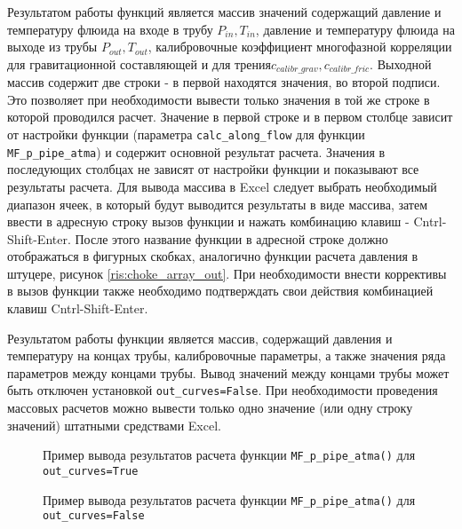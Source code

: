Результатом работы функций является массив значений содержащий давление и температуру флюида на входе в трубу $P_{in}, T_{in}$, давление и температуру флюида на выходе из трубы $P_{out}, T_{out}$,  калибровочные коэффициент многофазной корреляции для гравитационной составляющей и для трения$c_{calibr\_grav},c_{calibr\_fric}$.  Выходной массив содержит две строки - в первой находятся значения, во второй подписи. Это позволяет при необходимости вывести только значения в той же строке в которой проводился расчет. Значение в первой строке и в первом столбце зависит от настройки функции (параметра \texttt{calc_along_flow} для функции \texttt{MF_p_pipe_atma}) и содержит основной результат расчета. Значения в последующих столбцах не зависят от настройки функции и показывают все результаты расчета.
Для вывода массива в Excel следует выбрать необходимый диапазон ячеек, в который будут выводится результаты в виде массива, затем ввести в адресную строку вызов функции и нажать комбинацию клавиш - Cntrl-Shift-Enter. После этого название функции в адресной строке должно отображаться в фигурных скобках, аналогично функции расчета давления в штуцере, рисунок \ref{ris:choke_array_out}. При необходимости внести коррективы в вызов функции также необходимо подтверждать свои действия комбинацией клавиш Cntrl-Shift-Enter.


Результатом работы функции является массив, содержащий давления и температуру на концах трубы, калибровочные параметры, а также значения ряда параметров между концами трубы. Вывод значений между концами трубы может быть отключен установкой \texttt{out_curves=False}. При необходимости проведения массовых расчетов можно вывести только одно значение (или одну строку значений) штатными средствами Excel. 

\begin{figure}[ht]
	\caption{Пример вывода результатов расчета функции \texttt{MF_p_pipe_atma()} для  \texttt{out_curves=True} }
	\label{ris:pipe_out_example}
\end{figure}

\begin{figure}[ht]
	\caption{Пример вывода результатов расчета функции \texttt{MF_p_pipe_atma()} для  \texttt{out_curves=False} }
	\label{ris:pipe_out_example_short}
\end{figure}

